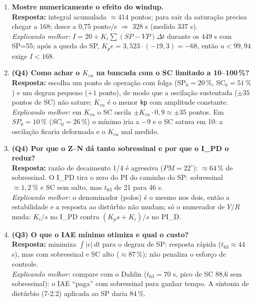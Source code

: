 \documentclass[11pt,a4paper]{article}
\begin{document}
\begin{enumerate}[leftmargin=*]
\item \textbf{Mostre numericamente o efeito do windup.}\\
\textbf{Resposta:} integral acumulada $\approx414$ pontos; para sair da saturação precisa chegar a 168; desce a 0,75 ponto/s $\Rightarrow$ 328 s (medido 337 s).\\
\emph{Explicando melhor:} $I=20+K_i\sum(SP-VP)\Delta t$ durante os 449 s com SP=55; após a queda do SP, $K_pe=3{,}523\cdot(-19{,}3)=-68$, então $u<99{,}94$ exige $I<168$.
\item \textbf{(Q4) Como achar o $K_{cu}$ na bancada com o SC limitado a 10--100\,\%?}\\
\textbf{Resposta:} escolha um ponto de operação com folga (SP$_0=20\,\%$, SC$_0=51\,\%$) e um degrau pequeno ($+1$ ponto), de modo que a oscilação sustentada ($\pm35$ pontos de SC) não sature; $K_{cu}$ é o menor \texttt{kp} com amplitude constante.\\
\emph{Explicando melhor:} em $K_{cu}$ o SC oscila $\pm K_{cu}\cdot0{,}9\approx\pm35$ pontos. Em $SP_0=10\,\%$ ($SC_0=26\,\%$) o mínimo iria a $-9$ e o SC satura em 10: a oscilação ficaria deformada e o $K_{cu}$ mal medido.
\item \textbf{(Q4) Por que o Z--N dá tanto sobressinal e por que o I\_PD o reduz?}\\
\textbf{Resposta:} razão de decaimento 1/4 é agressiva ($PM=22^\circ$): $\approx64\,\%$ de sobressinal. O I\_PD tira o zero do PI do caminho do SP: sobressinal $\approx1{,}2\,\%$ e SC sem salto, mas $t_{63}$ de 21 para 46 s.\\
\emph{Explicando melhor:} o denominador (polos) é o mesmo nos dois, então a estabilidade e a resposta ao distúrbio não mudam; só o numerador de $Y/R$ muda: $K_i/s$ no I\_PD contra $(K_ps+K_i)/s$ no PI\_D.
\item \textbf{(Q3) O que o IAE mínimo otimiza e qual o custo?}\\
\textbf{Resposta:} minimiza $\int|e|\,dt$ para o degrau de SP: resposta rápida ($t_{63}\approx44$ s), mas com sobressinal e SC alto ($\approx87\,\%$); não penaliza o esforço de controle.\\
\emph{Explicando melhor:} compare com o Dahlin ($t_{63}=70$ s, pico de SC 88,6 sem sobressinal): o IAE ``paga'' com sobressinal para ganhar tempo. A sintonia de distúrbio (7-2.2) aplicada ao SP daria 84\,\%.
\end{enumerate}
\end{document}
